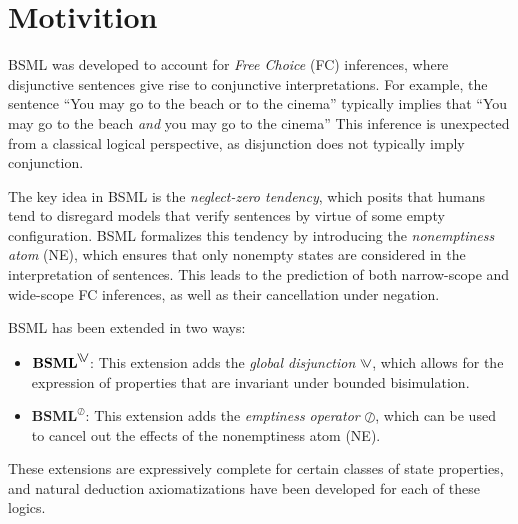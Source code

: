 \section{Motivition}\label{Motivition}

BSML was developed to account for \textit{Free Choice} (FC) inferences, where disjunctive sentences give rise to conjunctive interpretations. For example, the sentence ``You may go to the beach or to the cinema'' typically implies that ``You may go to the beach \textit{and} you may go to the cinema'' This inference is unexpected from a classical logical perspective, as disjunction does not typically imply conjunction.

The key idea in BSML is the \textit{neglect-zero tendency}, which posits that humans tend to disregard models that verify sentences by virtue of some empty configuration. BSML formalizes this tendency by introducing the \textit{nonemptiness atom} (NE), which ensures that only nonempty states are considered in the interpretation of sentences. This leads to the prediction of both narrow-scope and wide-scope FC inferences, as well as their cancellation under negation.

BSML has been extended in two ways:
\begin{itemize}
    \item \(\textbf{BSML}^{\inqdisj}\): This extension adds the \textit{global disjunction} \(\inqdisj\), which allows for the expression of properties that are invariant under bounded bisimulation.
    \item \(\textbf{BSML}^{\oslash}\): This extension adds the \textit{emptiness operator} \(\oslash\), which can be used to cancel out the effects of the nonemptiness atom (NE).
\end{itemize}

These extensions are expressively complete for certain classes of state properties, and natural deduction axiomatizations have been developed for each of these logics.

